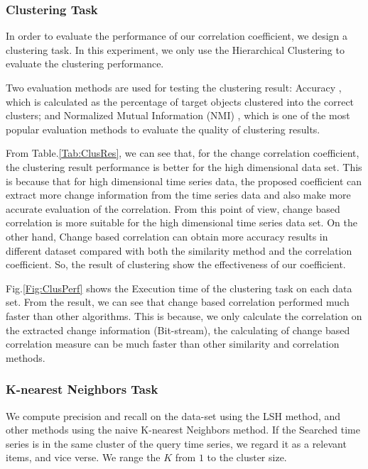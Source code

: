 \subsubsection{Clustering Task}

In order to evaluate the performance of our correlation coefficient, we design a clustering task. In this experiment, we only use the Hierarchical Clustering \cite{han2011data} to evaluate the clustering performance.

Two evaluation methods are used for testing the clustering result: Accuracy \cite{han2011data}, which is calculated as the percentage of target objects clustered into the correct clusters; and Normalized Mutual Information (NMI) \cite{han2011data}, which is one of the most popular evaluation methods to evaluate the quality of clustering results.

From Table.\ref{Tab:ClusRes}, we can see that, for the change correlation coefficient, the clustering result performance is better for the high dimensional data set.
This is because that for high dimensional time series data, the proposed coefficient can extract more change information from the time series data and also make more accurate evaluation of the correlation. 
From this point of view, change based correlation is more suitable for the high dimensional time series data set.
On the other hand, Change based correlation can obtain more accuracy results in different dataset compared with both the similarity method and the correlation coefficient. So, the result of clustering show the effectiveness of our coefficient.


Fig.\ref{Fig:ClusPerf} shows the Execution time of the clustering task on each data set. From the result, we can see that change based correlation performed much faster than other algorithms. This is because, we only calculate the correlation on the extracted change information (Bit-stream), the calculating of change based correlation measure can be much faster than other similarity and correlation methods.


\subsubsection{K-nearest Neighbors Task}

We compute precision and recall \cite{powers2011evaluation} on the data-set using the LSH method, and other methods using the naive K-nearest Neighbors method. 
If the Searched time series is in the same cluster of the query time series, we regard it as a relevant items, and vice verse. We range the $K$ from $1$ to the cluster size. 

